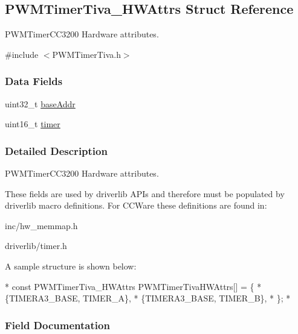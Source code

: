 \subsection{P\-W\-M\-Timer\-Tiva\-\_\-\-H\-W\-Attrs Struct Reference}
\label{struct_p_w_m_timer_tiva___h_w_attrs}


P\-W\-M\-Timer\-C\-C3200 Hardware attributes.  




{\ttfamily \#include $<$P\-W\-M\-Timer\-Tiva.\-h$>$}

\subsubsection*{Data Fields}
\begin{DoxyCompactItemize}
\item 
uint32\-\_\-t \hyperlink{struct_p_w_m_timer_tiva___h_w_attrs_a1514de8d9b83a66fbed22b8427d20655}{base\-Addr}
\item 
uint16\-\_\-t \hyperlink{struct_p_w_m_timer_tiva___h_w_attrs_aa14d05c47183c46a7314da656125bbc9}{timer}
\end{DoxyCompactItemize}


\subsubsection{Detailed Description}
P\-W\-M\-Timer\-C\-C3200 Hardware attributes. 

These fields are used by driverlib A\-P\-Is and therefore must be populated by driverlib macro definitions. For C\-C\-Ware these definitions are found in\-:
\begin{DoxyItemize}
\item inc/hw\-\_\-memmap.\-h
\item driverlib/timer.\-h
\end{DoxyItemize}

A sample structure is shown below\-: 
\begin{DoxyCode}
*  \textcolor{keyword}{const} PWMTimerTiva_HWAttrs PWMTimerTivaHWAttrs[] = \{
*      \{TIMERA3\_BASE, TIMER\_A\},
*      \{TIMERA3\_BASE, TIMER\_B\},
*  \};
*  
\end{DoxyCode}
 

\subsubsection{Field Documentation}
